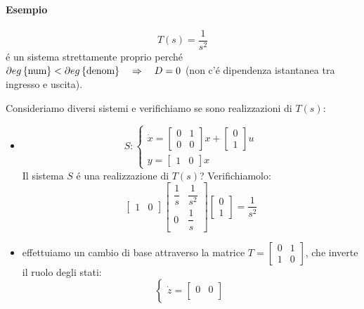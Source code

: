 \documentclass[../main.tex]{subfiles}
\begin{document}
		\begin{mdframed}[style=Esempio]
			\paragraph{Esempio}
			\[
				T(s) = \dfrac{1}{s^2}				
			\]
			\'e un sistema strettamente proprio perch\'e $ \partial eg \left\lbrace \text{num} \right\rbrace < \partial eg \left\lbrace \text{denom} \right\rbrace \quad\Rightarrow\quad D = 0 $ (non c'\'e dipendenza istantanea tra ingresso e uscita).
			
			Consideriamo diversi sistemi e verifichiamo se sono realizzazioni di $ T(s) $:
			\begin{itemize}
				\item 
					\[
						S:
						\begin{cases}
							\dot x =
							\begin{bmatrix}
								0 & 1\\
								0 & 0
							\end{bmatrix} x+
							\begin{bmatrix}
								0\\
								1
							\end{bmatrix} u
							\\[1em]
							y =
							\begin{bmatrix}
								1 & 0
							\end{bmatrix} x
						\end{cases}
					\]
					Il sistema $ S $ \'e una realizzazione di $ T(s) $? Verifichiamolo:
					\[
						\begin{bmatrix}
							1 & 0
						\end{bmatrix}
						\begin{bmatrix}
							\dfrac{1}{s} & \dfrac{1}{s^2}
							\\[1em]
							0 & \dfrac{1}{s}
						\end{bmatrix}
						\begin{bmatrix}
							0\\
							1
						\end{bmatrix} = \dfrac{1}{s^2}
					\]
				\item 
					effettuiamo un cambio di base attraverso la matrice $ T = \begin{bmatrix} 0 & 1\\ 1 & 0 \end{bmatrix} $, che inverte il ruolo degli stati:
					\[
						\begin{cases}
						\dot z =
						\begin{bmatrix}
							0 & 0\\

\end{bmatrix}
\end{cases}\]
\end{itemize}
\end{mdframed}
\end{document}
